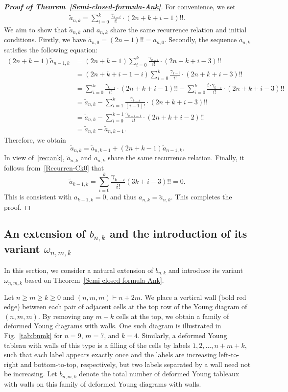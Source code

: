 \documentclass[reqno, 12pt]{article}
\theoremstyle{mydefinition}
\theoremstyle{myremark}
\numberwithin{algorithm}{section}
\begin{document}
\begin{proof}[{\bf Proof of Theorem~\ref{Semi-closed-formula-Ank}}]
For convenience, we set
\begin{align*}
\tilde{a}_{n,k}=\sum_{i=0}^k \frac{\gamma_{k-i}}{i!}\cdot (2n+k+i-1)!!.
\end{align*}
We aim to show that $\tilde{a}_{n,k}$ and $a_{n,k}$ share the same recurrence relation and initial conditions.
Firstly, we have $\tilde{a}_{n,0}=(2n-1)!!=a_{n,0}$.
Secondly, the sequence $\tilde{a}_{n,k}$ satisfies the following equation:
\begin{align*}
(2n+k-1)\tilde{a}_{n-1,k}& =(2n+k-1)\sum_{i=0}^k \frac{\gamma_{k-i}}{i!}\cdot (2n+k+i-3)!!
\\&=(2n+k+i-1-i)\sum_{i=0}^k \frac{\gamma_{k-i}}{i!}\cdot (2n+k+i-3)!!
\\&=\sum_{i=0}^k \frac{\gamma_{k-i}}{i!}\cdot (2n+k+i-1)!!-\sum_{i=0}^k \frac{i\cdot\gamma_{k-i}}{i!}\cdot (2n+k+i-3)!!
\\&=\tilde{a}_{n,k}-\sum_{i=1}^{k} \frac{\gamma_{k-i}}{(i-1)!}\cdot (2n+k+i-3)!!
\\&=\tilde{a}_{n,k}-\sum_{i=0}^{k-1} \frac{\gamma_{k-i-1}}{i!}\cdot (2n+k+i-2)!!
\\&=\tilde{a}_{n,k}-\tilde{a}_{n,k-1}.
\end{align*}
Therefore, we obtain
$$\tilde{a}_{n,k}=\tilde{a}_{n,k-1}+(2n+k-1)\tilde a_{n-1,k}.$$
In view of~\eqref{rec:ank},  $\tilde{a}_{n,k}$ and $a_{n,k}$ share the same recurrence relation.
Finally, it follows from~\eqref{Recurren-Ck0} that
$$\tilde{a}_{k-1,k}=\sum_{i=0}^{k} \frac{\gamma_{k-i}}{i!} (3k+i-3)!!=0.$$
This is consistent with $a_{k-1,k}=0$, and thus $a_{n,k}=\tilde{a}_{n,k}$.
This completes the proof.
\end{proof}



\subsection{An extension of $b_{n,k}$ and the introduction of its variant $\omega_{n,m,k}$}
\label{Section-Extension-of-bnk}

In this section, we consider a natural  extension of $b_{n,k}$ and introduce  its variant $\omega_{n,m,k}$ based on Theorem~\ref{Semi-closed-formula-Ank}.

Let $n\geq m\geq k\geq 0$ and $(n,m,m)\vdash n+2m$.
We place a vertical wall (bold red edge) between each pair of adjacent cells at the top row of the Young diagram of $(n,m,m)$.
By removing any $m-k$ cells at the top, we obtain a family of deformed Young diagrams with walls.
One such diagram is illustrated in Fig.~\ref{tab:bnmk} for $n=9$, $m=7$, and $k=4$.
Similarly, a deformed Young tableau with walls of this type is a filling of the cells by labels $1,2,\dots, n+m+k$, such that each label appears exactly once and the labels are increasing left-to-right and bottom-to-top, respectively, but two labels separated by a wall need not be increasing.
Let $b_{n,m,k}$ denote the total number of deformed Young tableaux with walls on this family of deformed Young diagrams with walls.
\end{document}
